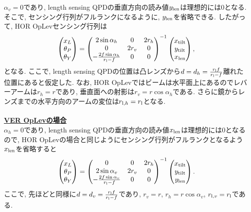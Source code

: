 $\alpha_v=0$であり, length sensing QPDの垂直方向の読み値$y_{\rm len}$は理想的には0となる. そこで, センシング行列がフルランクになるように, $y_{\rm len}$を省略できる. したがって, HOR OpLevセンシング行列は
\begin{equation}
\begin{pmatrix}
x_L\\
\theta_P\\
\theta_Y
\end{pmatrix}
=
\begin{pmatrix}
2\sin\alpha_h & 0 & 2r_h\\
0 & 2r_v & 0\\
-\frac{2f\sin\alpha_h}{r_{\rm l}-f} & 0 & 0
\end{pmatrix}^{-1}
\begin{pmatrix}
x_{\rm tilt}\\
y_{\rm tilt}\\
x_{\rm len}
\end{pmatrix},
\end{equation}
となる. ここで, length sensing QPDの位置は凸レンズから$d=d_h=\frac{r_{\rm l}f}{r_{\rm l}-f}$離れた位置にあると仮定した. なお, HOR OpLevではビームは水平面上にあるのでレバーアームは$r_h=r$であり, 垂直面への射影は$r_v=r\cos\alpha_h$である. さらに鏡からレンズまでの水平方向のアームの変位は$r_{{\rm l},h}=r_{\rm l}$となる. \\\\
\textbf{\underline{VER OpLevの場合}}\\
$\alpha_h=0$であり, length sensing QPDの垂直方向の読み値$x_{\rm len}$は理想的には0となるので, HOR OpLevの場合と同じようにセンシング行列がフルランクとなるよう$x_{\rm len}$を省略すると
\begin{equation}
\begin{pmatrix}
x_L\\
\theta_P\\
\theta_Y
\end{pmatrix}
=
\begin{pmatrix}
0 & 0 & 2r_h\\
2\sin\alpha_v & 2r_v & 0\\
-\frac{2f\sin\alpha_v}{r_{\rm l}-f} & 0 & 0
\end{pmatrix}^{-1}
\begin{pmatrix}
x_{\rm tilt}\\
y_{\rm tilt}\\
y_{\rm len}
\end{pmatrix}.
\end{equation}
ここで, 先ほどと同様に$d=d_v=\frac{r_{\rm l}f}{r_{\rm l}-f}$であり, $r_v=r$, $r_h=r\cos\alpha_v$, $r_{{\rm l},v}=r_{\rm l}$である. 